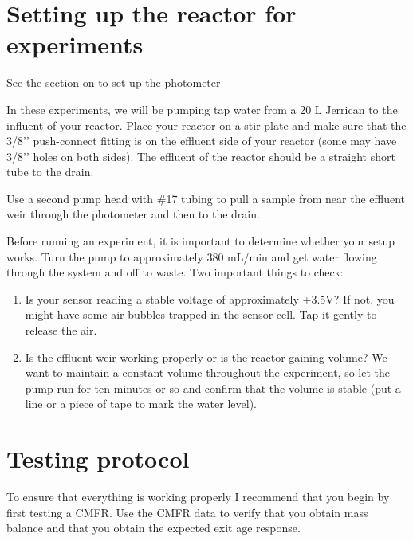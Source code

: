 \documentclass[letterpaper,10pt,english]{sphinxmanual}
\begin{document}
\section{Setting up the reactor for experiments}
\label{\detokenize{Reactor_Characteristics/Reactor_Characteristics:setting-up-the-reactor-for-experiments}}\label{\detokenize{Reactor_Characteristics/Reactor_Characteristics:heading-reactor-setting-up-the-reactor-for-experiments}}
See the section on {\hyperref[\detokenize{ProCoDA/ProCoDA:heading-procoda-photometer}]{}} to set up the photometer

In these experiments, we will be pumping tap water from a 20 L Jerrican to the influent of your reactor. Place your reactor on a stir plate and make sure that the 3/8’’ push-connect fitting is on the effluent side of your reactor (some may have 3/8’’ holes on both sides). The effluent of the reactor should be a straight short tube to the drain.

Use a second pump head with \#17 tubing to pull a sample from near the effluent weir through the photometer and then to the drain.

Before running an experiment, it is important to determine whether your setup works. Turn the pump to approximately 380 mL/min and get water flowing through the system and off to waste. Two important things to check:
\begin{enumerate}
\item {} 
Is your sensor reading a stable voltage of approximately +3.5V? If not, you might have some air bubbles trapped in the sensor cell. Tap it gently to release the air.

\item {} 
Is the effluent weir working properly or is the reactor gaining volume? We want to maintain a constant volume throughout the experiment, so let the pump run for ten minutes or so and confirm that the volume is stable (put a line or a piece of tape to mark the water level).

\end{enumerate}


\section{Testing protocol}
\label{\detokenize{Reactor_Characteristics/Reactor_Characteristics:testing-protocol}}\label{\detokenize{Reactor_Characteristics/Reactor_Characteristics:heading-reactor-testing-protocol}}
To ensure that everything is working properly I recommend that you begin by first testing a CMFR. Use the CMFR data to verify that you obtain mass balance and that you obtain the expected exit age response.
\end{document}
